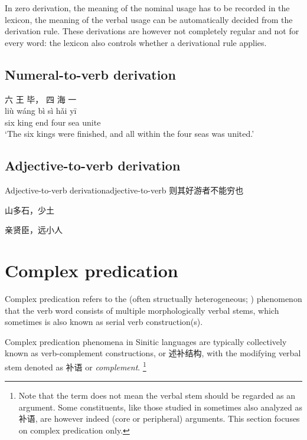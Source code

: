 \documentclass[UTF8, a4paper, oneside, scheme=plain, 12pt]{ctexrep}
\newcommand*{\citepages}[1]{pp.~{#1}}
\newcommand*{\term}[1]{\emph{#1}}
\newcommand{\translate}[1]{`#1'}
\begin{document}
In zero derivation, the meaning of the nominal usage has to be recorded in the lexicon,
the meaning of the verbal usage can be automatically decided from the derivation rule.
These derivations are however not completely regular and not for every word:
the lexicon also controls whether a derivational rule applies.


\subsection{Numeral-to-verb derivation}

\begin{exe}
    \ex
    \glll 六 王 毕， 四 海 一 \\
    liù wáng bì sì hǎi yī \\
    six king end four sea unite \\
    \glt\translate{The six kings were finished, and all within the four seas was united.}
\end{exe}

\subsection{Adjective-to-verb derivation}

\begin{todobox}{Adjective-to-verb derivation}{adjective-to-verb}
    则其好游者不能穷也

    山多石，少土

    亲贤臣，远小人
\end{todobox}

\section{Complex predication}\label{sec:verbs.complement}

Complex predication refers to the (often structually heterogeneous; \citealt{paul2008serial}) phenomenon 
that the verb word consists of multiple morphologically verbal stems,
which sometimes is also known as serial verb construction(s).

Complex predication phenomena in Sinitic languages are typically collectively known as verb-complement constructions, or 述补结构,
with the modifying verbal stem denoted as 补语 or \term{complement}.%
\footnote{
    Note that the term does not mean the verbal stem should be regarded as an argument.
    Some constituents, like those studied in \citep[\citepages{126-177}]{he2005shiji} sometimes also analyzed as 补语,
    are however indeed (core or peripheral) arguments.
    This section focuses on complex predication only.
}
\end{document}
